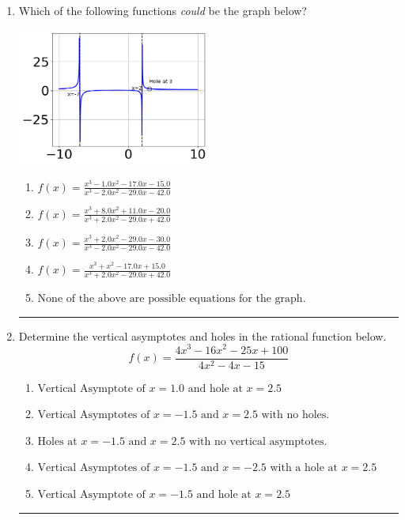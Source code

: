 \documentclass[14pt]{extbook}
\newcommand{\litem}[1]{\item#1\hspace*{-1cm}\rule{\textwidth}{0.4pt}}
\begin{document}
\begin{enumerate}
{\begin{enumerate}[label=\Alph*.]
\end{enumerate} }
\litem{
Which of the following functions \textit{could} be the graph below?
\begin{center}
    \includegraphics[width=0.5\textwidth]{../Figures/identifyGraphOfRationalFunctionB.png}
\end{center}
\begin{enumerate}[label=\Alph*.]
\item \( f(x)=\frac{x^{3} -1.0 x^{2} -17.0 x -15.0}{x^{3} -2.0 x^{2} -29.0 x -42.0} \)
\item \( f(x)=\frac{x^{3} +8.0 x^{2} +11.0 x -20.0}{x^{3} +2.0 x^{2} -29.0 x + 42.0} \)
\item \( f(x)=\frac{x^{3} +2.0 x^{2} -29.0 x -30.0}{x^{3} -2.0 x^{2} -29.0 x -42.0} \)
\item \( f(x)=\frac{x^{3} + x^{2} -17.0 x + 15.0}{x^{3} +2.0 x^{2} -29.0 x + 42.0} \)
\item \( \text{None of the above are possible equations for the graph.} \)

\end{enumerate} }
\litem{
Determine the vertical asymptotes and holes in the rational function below.\[ f(x) = \frac{4x^{3} -16 x^{2} -25 x + 100}{4x^{2} -4 x -15} \]\begin{enumerate}[label=\Alph*.]
\item \( \text{Vertical Asymptote of } x = 1.0 \text{ and hole at } x = 2.5 \)
\item \( \text{Vertical Asymptotes of } x = -1.5 \text{ and } x = 2.5 \text{ with no holes.} \)
\item \( \text{Holes at } x = -1.5 \text{ and } x = 2.5 \text{ with no vertical asymptotes.} \)
\item \( \text{Vertical Asymptotes of } x = -1.5 \text{ and } x = -2.5 \text{ with a hole at } x = 2.5 \)
\item \( \text{Vertical Asymptote of } x = -1.5 \text{ and hole at } x = 2.5 \)


\end{enumerate}}
\end{enumerate}
\end{document}
